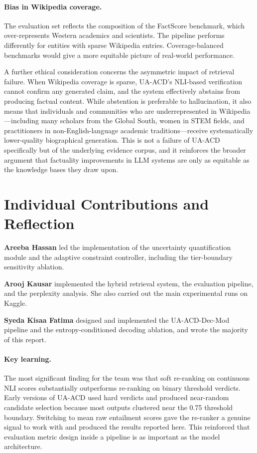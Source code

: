 \documentclass[11pt]{article}
\begin{document}
\paragraph{Bias in Wikipedia coverage.}
The evaluation set reflects the composition of the FactScore benchmark, which over-represents Western academics and scientists. The pipeline performs differently for entities with sparse Wikipedia entries. Coverage-balanced benchmarks would give a more equitable picture of
real-world performance.

A further ethical consideration concerns the asymmetric impact of retrieval failure. When Wikipedia coverage is sparse, UA-ACD's NLI-based verification cannot confirm any generated claim, and the system effectively abstains from producing factual content. While abstention is preferable to hallucination, it also means that individuals and communities who are underrepresented in Wikipedia---including many scholars from the Global South, women in STEM fields, and practitioners in non-English-language academic traditions---receive systematically lower-quality biographical generation. This is not a failure of UA-ACD specifically but of the underlying evidence corpus, and it reinforces the broader argument that factuality improvements in LLM systems are only as equitable as the knowledge bases they draw upon.

\section{Individual Contributions and Reflection}

\textbf{Areeba Hassan} led the implementation of the uncertainty quantification module and the adaptive constraint controller, including the tier-boundary sensitivity ablation.

\textbf{Arooj Kausar} implemented the hybrid retrieval system, the evaluation pipeline, and the perplexity analysis. She also carried out the main experimental runs on Kaggle.

\textbf{Syeda Kisaa Fatima} designed and implemented the UA-ACD-Dec-Mod pipeline and the entropy-conditioned decoding ablation, and wrote the majority of this report.

\paragraph{Key learning.}
The most significant finding for the team was that soft re-ranking on continuous NLI scores substantially outperforms re-ranking on binary threshold verdicts. Early versions of UA-ACD used hard verdicts and produced near-random candidate selection because most outputs clustered
near the 0.75 threshold boundary. Switching to mean raw entailment scores gave the re-ranker a genuine signal to work with and produced the results reported here. This reinforced that evaluation metric design inside a pipeline is as important as the model architecture.
\end{document}
